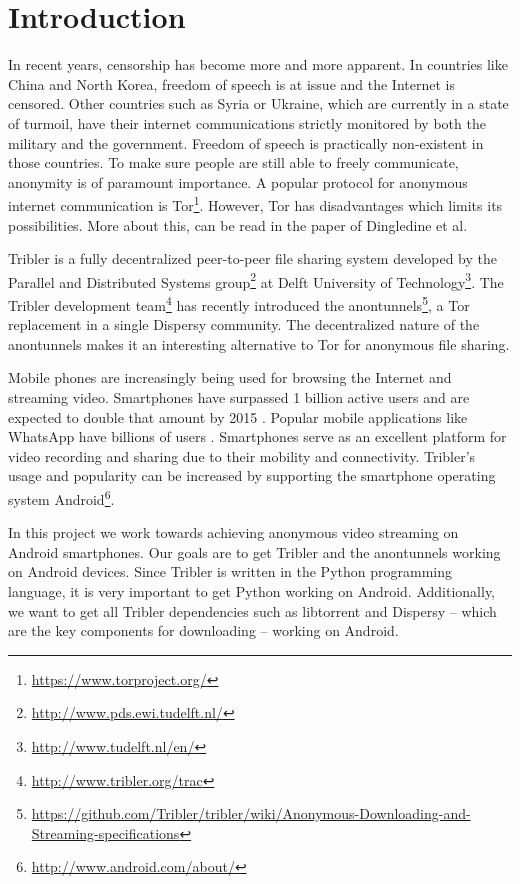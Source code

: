 \chapter{Introduction}
In recent years, censorship has become more and more apparent. In countries like China and North Korea, freedom of speech is at issue and the Internet is censored. Other countries such as Syria or Ukraine, which are currently in a state of turmoil, have their internet communications strictly monitored by both the military and the government. Freedom of speech is practically non-existent in those countries. To make sure people are still able to freely communicate, anonymity is of paramount importance. A popular protocol for anonymous internet communication is Tor\footnote{\url{https://www.torproject.org/}}. However, Tor has disadvantages which limits its possibilities. More about this, can be read in the paper of Dingledine et al. \cite{dingledine2009performance}

Tribler is a fully decentralized peer-to-peer file sharing system developed by the Parallel and Distributed Systems group\footnote{\url{http://www.pds.ewi.tudelft.nl/}} at Delft University of Technology\footnote{\url{http://www.tudelft.nl/en/}}. The Tribler development team\footnote{\url{http://www.tribler.org/trac}} has recently introduced the anontunnels\footnote{\url{https://github.com/Tribler/tribler/wiki/Anonymous-Downloading-and-Streaming-specifications}}, a Tor replacement in a single Dispersy\cite{zeilemaker2013dispersy} community. The decentralized nature of the anontunnels makes it an interesting alternative to Tor for anonymous file sharing.

Mobile phones are increasingly being used for browsing the Internet and streaming video. Smartphones have surpassed 1 billion active users and are expected to double that amount by 2015 \cite{yang2015smartphones}. Popular mobile applications like WhatsApp have billions of users \cite{googleplayinstagram, googleplaywhatsapp}. Smartphones serve as an excellent platform for video recording and sharing due to their mobility and connectivity. Tribler's usage and popularity can be increased by supporting the smartphone operating system Android\footnote{\url{http://www.android.com/about/}}.

In this project we work towards achieving anonymous video streaming on Android smartphones. Our goals are to get Tribler and the anontunnels working on Android devices. Since Tribler is written in the Python programming language, it is very important to get Python working on Android. Additionally, we want to get all Tribler dependencies such as libtorrent and Dispersy -- which are the key components for downloading -- working on Android.

